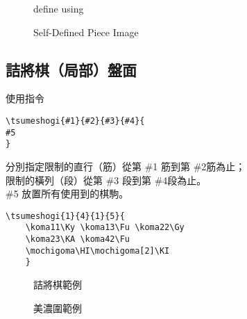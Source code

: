 \documentclass[a4paper, 10pt,]{article}
\begin{document}
\begin{figure}[h]
  \begin{minipage}[h]{0.5\linewidth}
    \centering
    \gazouka
    \caption{define using \texttt{\gazouka}\\}
    \label{fig:side:a}
  \end{minipage}%
  \begin{minipage}[h]{0.5\linewidth}
    \centering
    \def\komapath{Portella}
  \gazouka
    \caption{Self-Defined Piece Image}
    \label{fig:side:b}
  \end{minipage}
\end{figure}



\subsection{詰將棋（局部）盤面}
使用指令
\begin{lstlisting}
\tsumeshogi{#1}{#2}{#3}{#4}{
#5
}
\end{lstlisting}
分別指定限制的直行（筋）從第 \#1 筋到第 \#2筋為止；\\
限制的橫列（段）從第 \#3 段到第 \#4段為止。\\
\#5 放置所有使用到的棋駒。
\begin{lstlisting}
\tsumeshogi{1}{4}{1}{5}{
    \koma11\Ky \koma13\Fu \koma22\Gy
    \koma23\KA \koma42\Fu
    \mochigoma\HI\mochigoma[2]\KI
    }
\end{lstlisting}

\begin{figure}[h]
  \begin{minipage}[h]{0.5\linewidth}
    \centering
    \caption{詰將棋範例}
    \label{fig:side:a}
  \end{minipage}%
  \begin{minipage}[h]{0.5\linewidth}
    \centering
    \caption{美濃圍範例}
    \label{fig:side:b}
  \end{minipage}
\end{figure}
\end{document}
